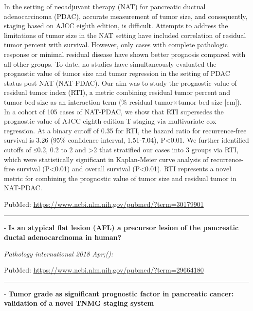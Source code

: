 \documentclass[]{article}
\begin{document}
In the setting of neoadjuvant therapy (NAT) for pancreatic ductual
adenocarcinoma (PDAC), accurate measurement of tumor size, and
consequently, staging based on AJCC eighth edition, is difficult.
Attempts to address the limitations of tumor size in the NAT setting
have included correlation of residual tumor percent with survival.
However, only cases with complete pathologic response or minimal
residual disease have shown better prognosis compared with all other
groups. To date, no studies have simultaneously evaluated the prognostic
value of tumor size and tumor regression in the setting of PDAC status
post NAT (NAT-PDAC). Our aim was to study the prognostic value of
residual tumor index (RTI), a metric combining residual tumor percent
and tumor bed size as an interaction term (\% residual tumor×tumor bed
size {[}cm{]}). In a cohort of 105 cases of NAT-PDAC, we show that RTI
supersedes the prognostic value of AJCC eighth edition T staging via
multivariate cox regression. At a binary cutoff of 0.35 for RTI, the
hazard ratio for recurrence-free survival is 3.26 (95\% confidence
interval, 1.51-7.04), P\textless{}0.01. We further identified cutoffs of
≤0.2, 0.2 to 2 and \textgreater{}2 that stratified our cases into 3
groups via RTI, which were statistically significant in Kaplan-Meier
curve analysis of recurrence-free survival (P\textless{}0.01) and
overall survival (P\textless{}0.01). RTI represents a novel metric for
combining the prognostic value of tumor size and residual tumor in
NAT-PDAC.

PubMed: \url{https://www.ncbi.nlm.nih.gov/pubmed/?term=30179901}

{}

{}

\begin{center}\rule{0.5\linewidth}{\linethickness}\end{center}

 - \textbf{Is an atypical flat lesion (AFL) a precursor lesion of the
pancreatic ductal adenocarcinoma in human?}

\emph{Pathology international 2018 Apr;():}

PubMed: \url{https://www.ncbi.nlm.nih.gov/pubmed/?term=29664180}

{}

{}

\begin{center}\rule{0.5\linewidth}{\linethickness}\end{center}

 - \textbf{Tumor grade as significant prognostic factor in pancreatic
cancer: validation of a novel TNMG staging system}
\end{document}
